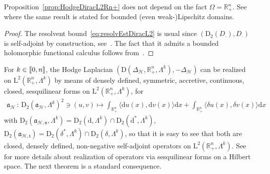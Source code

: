 \documentclass[AHL,Unicode,longabstracts,published]{cedram}
\newcommand{\bbR}{\mathbb{R}}
\newcommand{\rmd}{\mathrm{d}}
\newcommand{\rmD}{\mathrm{D}}
\newcommand{\rmL}{\mathrm{L}}
\newcommand{\clH}{\mathcal{H}}
\newcommand{\fkn}{\mathfrak{n}}
\newcommand{\fkt}{\mathfrak{t}}
\newcommand{\fka}{\mathfrak{a}}
\newcommand{\llbracket}{\mathopen{[\mkern -2.7mu[}}
\newcommand{\rrbracket}{\mathclose{]\mkern -2.7mu]}}
\newcommand{\llb}{\llbracket}
\newcommand{\rrb}{\rrbracket}
\begin{document}
\begin{rema}
Proposition~\ref{prop:HodgeDiracL2Rn+} does not depend on the fact $\Omega = \bbR^n_+$. See~\cite[Section~2]{McintoshMonniaux2018} where the same result is stated for bounded (even weak-)Lipschitz domains.
\end{rema}


\begin{proof}
The resolvent bound~\eqref{eq:resolvEstDiracL2} is usual since $(\rmD_2(D_\cdot),D_\cdot)$ is self-adjoint by construction, see~\cite[Proposition~C.4.2]{bookHaase2006}.
The fact that it admits a bounded holomorphic functional calculus follows from~\cite[Section~10]{McIntosh1986}.
\end{proof}


For $k\in\llb 0,n\rrb$, the Hodge Laplacian $(\rmD(\Delta_\clH,\bbR^n_+,\Lambda^k),-\Delta_\clH)$ can be realized on $\rmL^2(\bbR^n_+,\Lambda^k)$ by means of densely defined, symmetric, accretive, continuous, closed, sesquilinear forms on $\rmL^2(\bbR^n_+,\Lambda^k)$, for
\begin{align}\label{eq:sesqlinformLaplacianHodge}
\fka_\clH\,:\, \rmD_2\left(\fka_\clH,\Lambda^k\right)^2\ni(u,v) \longmapsto \int_{\bbR^n_+}\langle \rmd u(x), {\rmd v(x)}\rangle \rmd x + \int_{\bbR^n_+}\langle \delta u(x), {\delta v(x)}\rangle\rmd x
\end{align}
with $\rmD_2(\fka_{\clH,\fkn},\Lambda^k)= \rmD_2(\rmd,\Lambda^k)\cap\rmD_2(\rmd^\ast,\Lambda^k)$, $\rmD_2(\fka_{\clH,\fkt})= \rmD_2(\delta^\ast,\Lambda^k)\cap\rmD_2(\delta,\Lambda^k)$, so that it is easy to see that both are closed, densely defined, non-negative self-adjoint operators on $\rmL^2(\bbR^n_+,\Lambda^k)$. See~\cite[Chapter~1]{bookOuhabaz2005} for more details about realization of operators via sesquilinear forms on a Hilbert space. The next theorem is a standard consequence.
\end{document}
